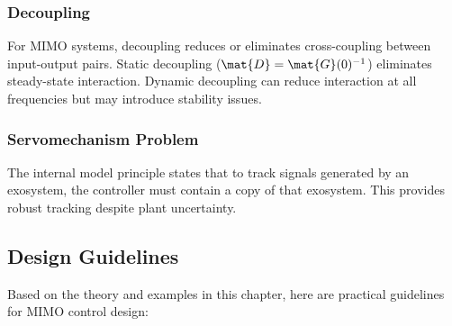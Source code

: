 \subsubsection{Decoupling}

For MIMO systems, decoupling reduces or eliminates cross-coupling between input-output pairs. Static decoupling ($\mat{D} = \mat{G}(0)^{-1}$) eliminates steady-state interaction. Dynamic decoupling can reduce interaction at all frequencies but may introduce stability issues.

\subsubsection{Servomechanism Problem}

The internal model principle states that to track signals generated by an exosystem, the controller must contain a copy of that exosystem. This provides robust tracking despite plant uncertainty.

\subsection{Design Guidelines}

Based on the theory and examples in this chapter, here are practical guidelines for MIMO control design:

